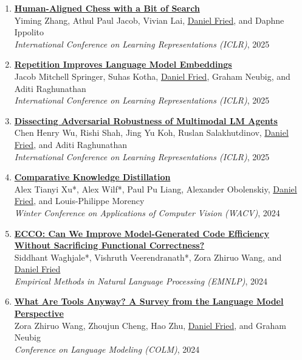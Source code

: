\begin{enumerate}[leftmargin=-1mm,partopsep=0pt]
\item \href{https://arxiv.org/abs/2410.03893}{\textbf{Human-Aligned Chess with a Bit of Search}} \\
  Yiming Zhang, Athul Paul Jacob, Vivian Lai, \underline{Daniel Fried}, and Daphne Ippolito\\
  \emph{International Conference on Learning Representations (ICLR)}, 2025

\item \href{https://arxiv.org/abs/2402.15449}{\textbf{Repetition Improves Language Model Embeddings}} \\
  Jacob Mitchell Springer, Suhas Kotha, \underline{Daniel Fried}, Graham Neubig, and Aditi Raghunathan\\
  \emph{International Conference on Learning Representations (ICLR)}, 2025

\item \href{https://arxiv.org/abs/2406.12814}{\textbf{Dissecting Adversarial Robustness of Multimodal LM Agents}} \\
  Chen Henry Wu, Rishi Shah, Jing Yu Koh, Ruslan Salakhutdinov, \underline{Daniel Fried}, and Aditi Raghunathan\\
  \emph{International Conference on Learning Representations (ICLR)}, 2025

\item \href{https://arxiv.org/abs/2311.02253}{\textbf{Comparative Knowledge Distillation}} \\
  Alex Tianyi Xu*, Alex Wilf*, Paul Pu Liang, Alexander Obolenskiy, \underline{Daniel Fried}, and Louis-Philippe Morency\\
  \emph{Winter Conference on Applications of Computer Vision (WACV)}, 2024

\item \href{http://arxiv.org/abs/2407.14044}{\textbf{ECCO: Can We Improve Model-Generated Code Efficiency Without Sacrificing Functional Correctness?}} \\
  Siddhant Waghjale*, Vishruth Veerendranath*, Zora Zhiruo Wang, and \underline{Daniel Fried}\\
  \emph{Empirical Methods in Natural Language Processing (EMNLP)}, 2024

\item \href{http://arxiv.org/abs/2403.15452}{\textbf{What Are Tools Anyway? A Survey from the Language Model Perspective}} \\
  Zora Zhiruo Wang, Zhoujun Cheng, Hao Zhu, \underline{Daniel Fried}, and Graham Neubig\\
  \emph{Conference on Language Modeling (COLM)}, 2024


\end{enumerate}
